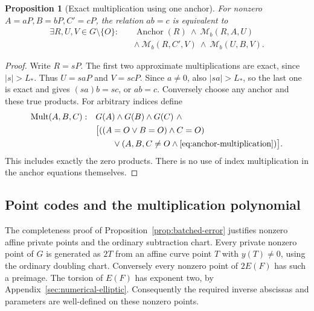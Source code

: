 \documentclass[11pt]{article}
\newtheorem{proposition}[theorem]{Proposition}
\theoremstyle{definition}
\newcommand{\Mult}{\operatorname{Mult}}
\begin{document}
\begin{proposition}[Exact multiplication using one anchor]
\label{prop:anchor-multiplication}
For nonzero \(A=aP,B=bP,C'=cP\), the relation \(ab=c\)
is equivalent to
\begin{equation}\label{eq:anchor-multiplication}
\begin{split}
 \exists R,U,V\in G\setminus\{O\}:\quad
 &\operatorname{Anchor}(R)\ \wedge\ \mathcal M_b(R,A,U)\\
 &\wedge\ \mathcal M_b(R,C',V)\ \wedge\ \mathcal M_b(U,B,V).
\end{split}
\end{equation}
\end{proposition}
\begin{proof}
Write \(R=sP\). The first two approximate multiplications are
exact, since \(|s|>L_*\). Thus \(U=saP\) and \(V=scP\).
Since \(a\ne0\), also \(|sa|>L_*\), so the last one is
exact and gives \((sa)b=sc\), or \(ab=c\). Conversely choose
any anchor and these true products. For arbitrary indices define
\[
\begin{split}
\Mult(A,B,C):\quad&G(A)\wedge G(B)\wedge G(C)\ \wedge\\
 &\bigl[((A=O\vee B=O)\wedge C=O)\\
 &\qquad\vee(A,B,C\ne O\wedge\text{\eqref{eq:anchor-multiplication}})\bigr].
\end{split}
\]
This includes exactly the zero products. There is no use of index multiplication in the anchor
equations themselves.
\end{proof}

\subsection{Point codes and the multiplication polynomial}\label{sec:full-multiplication}

The completeness proof of Proposition~\ref{prop:batched-error}
justifies nonzero affine private points and the ordinary subtraction
chart. Every private nonzero point of \(G\) is generated as \(2T\) from an
affine curve point \(T\) with \(y(T)\ne0\), using the ordinary
doubling chart. Conversely every nonzero point of \(2E(F)\) has such
a preimage. The torsion of \(E(F)\) has exponent two, by
Appendix~\ref{sec:numerical-elliptic}. Consequently the required inverse abscissas and parameters are
well-defined on these nonzero points.
\end{document}
